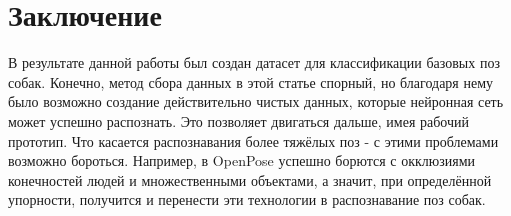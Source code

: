 \chapter*{Заключение}						%


В результате данной работы был создан датасет для классификации базовых поз собак. Конечно, метод сбора данных в этой статье спорный, но благодаря нему было возможно создание действительно чистых данных, которые нейронная сеть может успешно распознать. Это позволяет двигаться дальше, имея рабочий прототип. Что касается распознавания более тяжёлых поз - с этими проблемами возможно бороться. Например, в OpenPose\cite{openpose} успешно борются с окклюзиями конечностей людей и множественными объектами, а значит, при определённой упорности, получится и перенести эти технологии в распознавание поз собак.